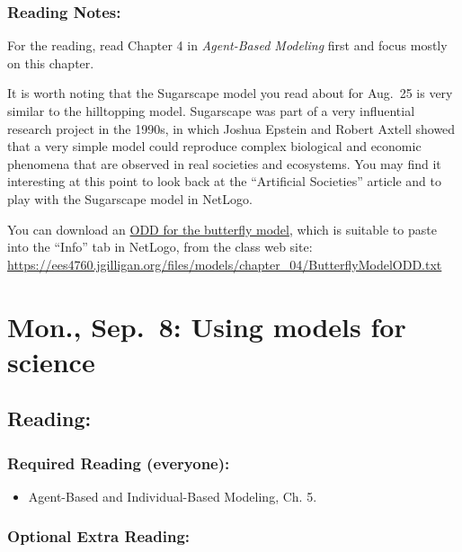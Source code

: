 \documentclass[
]{article}
\providecommand{\tightlist}{%
  \setlength{\itemsep}{0pt}\setlength{\parskip}{0pt}}
\begin{document}
\subsubsection{Reading Notes:}\label{reading-notes-3}

For the reading, read Chapter 4 in \emph{Agent-Based Modeling} first and
focus mostly on this chapter.

It is worth noting that the Sugarscape model you read about for Aug.~25
is very similar to the hilltopping model. Sugarscape was part of a very
influential research project in the 1990s, in which Joshua Epstein and
Robert Axtell showed that a very simple model could reproduce complex
biological and economic phenomena that are observed in real societies
and ecosystems. You may find it interesting at this point to look back
at the ``Artificial Societies'' article and to play with the Sugarscape
model in NetLogo.

You can download an
\href{/files/models/chapter_04/ButterflyModelODD.txt}{ODD for the
butterfly model}, which is suitable to paste into the ``Info'' tab in
NetLogo, from the class web site:
\url{https://ees4760.jgilligan.org/files/models/chapter_04/ButterflyModelODD.txt}

\section{Mon., Sep.~8: Using models for
science}\label{mon.-sep.-8-using-models-for-science}

\subsection{Reading:}\label{reading-5}

\subsubsection{Required Reading
(everyone):}\label{required-reading-everyone-4}

\begin{itemize}
\tightlist
\item
  Agent-Based and Individual-Based Modeling, Ch. 5.
\end{itemize}

\subsubsection{Optional Extra Reading:}\label{optional-extra-reading-2}
\end{document}
